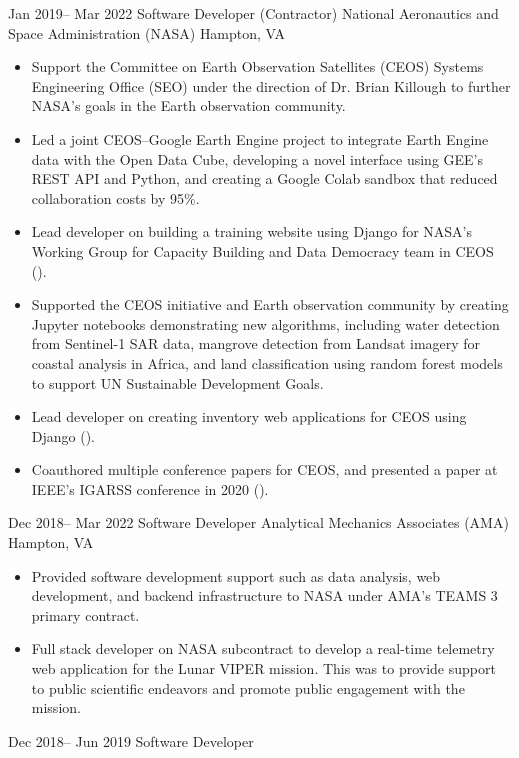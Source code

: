 \documentclass[10pt,legalpaper]{moderncv}
\begin{document}
\cventry
{Jan 2019-- Mar 2022  }
{Software Developer (Contractor)}
{National Aeronautics and Space Administration (NASA)}
{Hampton, VA}
{}
{
    \begin{itemize}
        \item{Support the Committee on Earth Observation Satellites (CEOS) Systems Engineering Office (SEO) under the direction of Dr. Brian Killough to further NASA's goals in the Earth observation community.}
        \item{Led a joint CEOS–Google Earth Engine project to integrate Earth Engine data with the Open Data Cube, developing a novel interface using GEE’s REST API and Python, and creating a Google Colab sandbox that reduced collaboration costs by 95\%.}
\item{Lead developer on building a training website using Django for NASA's Working Group for Capacity Building and Data Democracy team in CEOS ().}
        \item{Supported the CEOS initiative and Earth observation community by creating Jupyter notebooks demonstrating new algorithms, including water detection from Sentinel-1 SAR data, mangrove detection from Landsat imagery for coastal analysis in Africa, and land classification using random forest models to support UN Sustainable Development Goals.}
\item{Lead developer on creating inventory web applications for CEOS using Django ().}
\item{Coauthored multiple conference papers for CEOS, and presented a paper at IEEE's IGARSS conference in 2020 ().}
    \end{itemize}
}
\cventry
{Dec 2018-- Mar 2022  }
{Software Developer}
{Analytical Mechanics Associates (AMA)}
{Hampton, VA}
{}
{
    \begin{itemize}
        \item{Provided software development support such as data analysis, web development, and backend infrastructure to NASA under AMA's TEAMS 3 primary contract.}
        \item{Full stack developer on NASA subcontract to develop a real-time telemetry web application for the Lunar VIPER mission. This was to provide support to public scientific endeavors and promote public engagement with the mission.}
    \end{itemize}
}
\cventry
{Dec 2018-- Jun 2019  }
{Software Developer}
\end{document}
